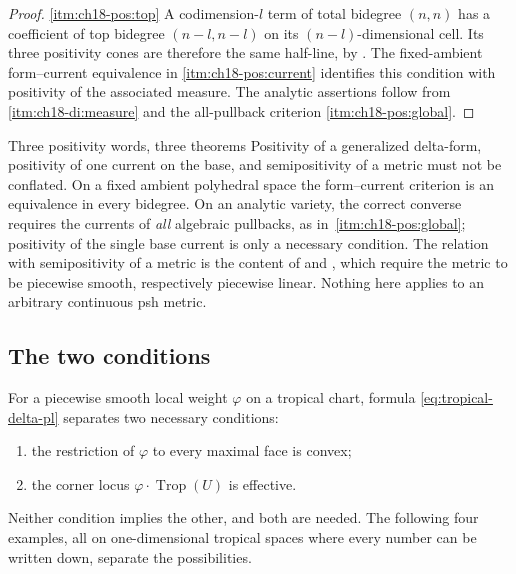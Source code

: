 \begin{proof}
\cref{itm:ch18-pos:top} A codimension-$l$ term of total bidegree $(n,n)$ has
a coefficient of top bidegree $(n-l,n-l)$ on its $(n-l)$-dimensional cell.
Its three positivity cones are therefore the same half-line, by
.  The fixed-ambient form--current
equivalence in \cref{itm:ch18-pos:current} identifies this condition with
positivity of the associated measure.  The analytic assertions follow from
\,\cref{itm:ch18-di:measure} and the
all-pullback criterion \cref{itm:ch18-pos:global}.

\end{proof}

\begin{warning}{Three positivity words, three theorems}
Positivity of a generalized delta-form, positivity of one current on the
base, and semipositivity of a metric must not be conflated.  On a fixed
ambient polyhedral space the form--current criterion is an equivalence in
every bidegree.  On an analytic variety, the correct converse requires the
currents of \emph{all} algebraic pullbacks, as in
\,\cref{itm:ch18-pos:global}; positivity
of the single base current is only a necessary condition.  The relation
with semipositivity of a metric is the content of
 and
, which require the metric to be
piecewise smooth, respectively piecewise linear.  Nothing here applies to an
arbitrary continuous psh metric.
\end{warning}

\subsection{The two conditions}
\label{sec:ch18-two-conditions}

For a piecewise smooth local weight $\varphi$ on a tropical chart, formula
\eqref{eq:tropical-delta-pl} separates two necessary conditions:
\begin{enumerate}
\item the restriction of $\varphi$ to every maximal face is convex;
\item the corner locus $\varphi\cdot\operatorname{Trop}(U)$ is effective.
\end{enumerate}

Neither condition implies the other, and both are needed.  The following
four examples, all on one-dimensional tropical spaces where every number can
be written down, separate the possibilities.


